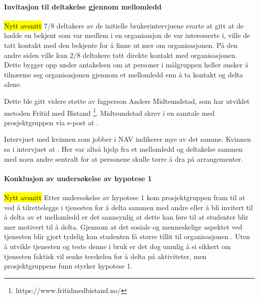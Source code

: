 \paragraph{Invitasjon til deltakelse gjennom mellomledd}
\hl{Nytt avsnitt}
7/8 deltakere av de initielle brukerintervjuene svarte at gitt at de hadde en bekjent som var medlem i en organisasjon de var interesserte i, ville de tatt kontakt med den bekjente for å finne ut mer om organisasjonen. På den andre siden ville kun 2/8 deltakere tatt direkte kontakt med organisasjonen. Dette bygger opp under antakelsen om at personer i målgruppen heller ønsker å tilnærme seg organisasjonen gjennom et mellomledd enn å ta kontakt og delta alene. 

Dette ble gitt videre støtte av fagperson Anders Midtsundstad, som har utviklet metoden Fritid med Bistand \footnote{https://www.fritidmedbistand.no/}. Midtsundstad skrev i en samtale med prosjektgruppen via e-post at  \cite{MIDTSUNDSTAD-EPOST:14}. 

Intervjuet med kvinnen som jobber i NAV indikerer mye av det samme. Kvinnen sa i intervjuet at  \cite{NAV-INTERVJU:16}. Her var altså hjelp fra et mellomledd og deltakelse sammen med noen andre sentralt for at personene skulle tørre å dra på arrangementer. 

\paragraph{Konklusjon av undersøkelse av hypotese 1}
\hl{Nytt avsnitt}
Etter undersøkelse av hypotese 1 kom prosjektgruppen fram til at ved å tilrettelegge i tjenesten for å delta sammen med andre eller å bli invitert til å delta av et mellomledd er det sannsynlig at dette kan føre til at studenter blir mer motivert til å delta. Gjennom at det sosiale og menneskelige aspektet ved tjenesten blir gjort tydelig kan studenten få større tillit til organisasjonen \cite{MIDTSUNDSTAD-EPOST:14}. Uten å utvikle tjenesten og teste denne i bruk er det dog umulig å si sikkert om tjenesten faktisk vil senke terskelen for å delta på aktiviteter, men prosjektgruppens funn styrker hypotese 1.

